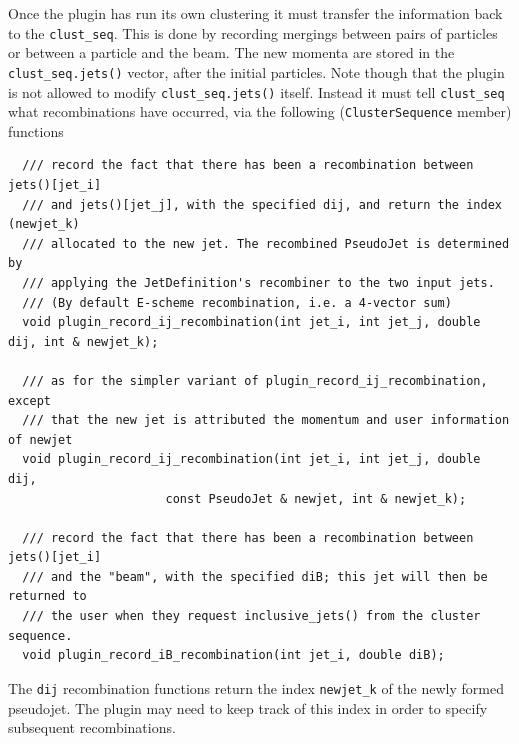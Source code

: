 \documentclass[12pt,a4]{article}
\newcommand{\ttt}[1]{{\small\texttt{#1}}}
\begin{document}
Once the plugin has run its own clustering it must transfer the
information back to the \ttt{clust\_seq}. This is done by recording
mergings between pairs of particles or between a particle and the
beam. The new momenta are stored in the \ttt{clust\_seq.jets()}
vector, after the initial particles. Note though that the plugin is
not allowed to modify \ttt{clust\_seq.jets()} itself. Instead it must
tell \ttt{clust\_seq} what recombinations have occurred, via the
following (\ttt{ClusterSequence} member) functions
\begin{lstlisting}
  /// record the fact that there has been a recombination between jets()[jet_i] 
  /// and jets()[jet_j], with the specified dij, and return the index (newjet_k) 
  /// allocated to the new jet. The recombined PseudoJet is determined by 
  /// applying the JetDefinition's recombiner to the two input jets.
  /// (By default E-scheme recombination, i.e. a 4-vector sum)
  void plugin_record_ij_recombination(int jet_i, int jet_j, double dij, int & newjet_k);

  /// as for the simpler variant of plugin_record_ij_recombination, except 
  /// that the new jet is attributed the momentum and user information of newjet
  void plugin_record_ij_recombination(int jet_i, int jet_j, double dij, 
				      const PseudoJet & newjet, int & newjet_k);

  /// record the fact that there has been a recombination between jets()[jet_i] 
  /// and the "beam", with the specified diB; this jet will then be returned to
  /// the user when they request inclusive_jets() from the cluster sequence.
  void plugin_record_iB_recombination(int jet_i, double diB);
\end{lstlisting}
The \ttt{dij} recombination functions return the index
\ttt{newjet\_k} of the newly formed pseudojet. The plugin may need to
keep track of this index in order to specify subsequent
recombinations.
\end{document}
